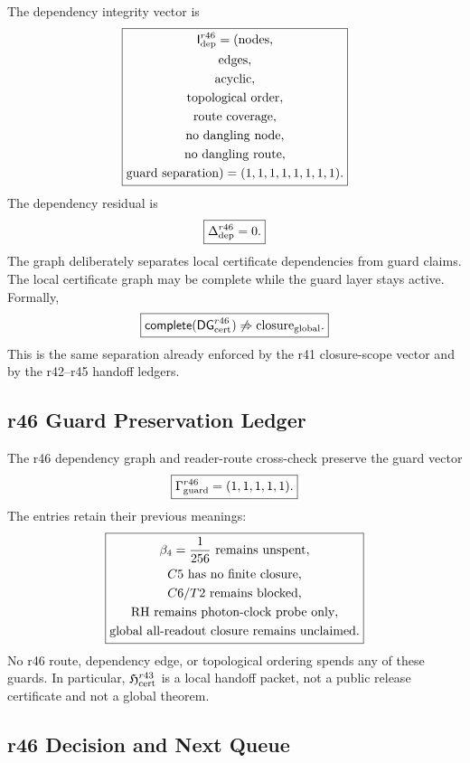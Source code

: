 The dependency integrity vector is
\[
\boxed{
\begin{gathered}
\mathsf I_{\rm dep}^{r46}
=
(
\mathrm{nodes},\\
\mathrm{edges},\\
\mathrm{acyclic},\\
\mathrm{topological\ order},\\
\mathrm{route\ coverage},\\
\mathrm{no\ dangling\ node},\\
\mathrm{no\ dangling\ route},\\
\mathrm{guard\ separation}
)
=(1,1,1,1,1,1,1,1).
\end{gathered}
}
\]
The dependency residual is
\[
\boxed{
\Delta_{\rm dep}^{r46}=0.
}
\]
The graph deliberately separates local certificate dependencies from guard
claims.  The local certificate graph may be complete while the guard layer stays
active.  Formally,
\[
\boxed{
\mathsf{complete}(\mathsf{DG}_{\rm cert}^{r46})
\not\Rightarrow
\mathrm{closure}_{\rm global}.
}
\]
This is the same separation already enforced by the r41 closure-scope vector and
by the r42--r45 handoff ledgers.

\subsection{r46 Guard Preservation Ledger}
\label{subsec:r46-guard-preservation-ledger}

The r46 dependency graph and reader-route cross-check preserve the guard vector
\[
\boxed{
\Gamma_{\rm guard}^{r46}=(1,1,1,1,1).
}
\]
The entries retain their previous meanings:
\[
\boxed{
\begin{gathered}
\beta_4={1\over256}\text{ remains unspent},\\
C5\text{ has no finite closure},\\
C6/T2\text{ remains blocked},\\
\mathrm{RH}\text{ remains photon-clock probe only},\\
\text{global all-readout closure remains unclaimed}.
\end{gathered}
}
\]
No r46 route, dependency edge, or topological ordering spends any of these
guards.  In particular, \(\mathfrak H_{\rm cert}^{r43}\) is a local handoff
packet, not a public release certificate and not a global theorem.

\subsection{r46 Decision and Next Queue}
\label{subsec:r46-decision-next-queue}

